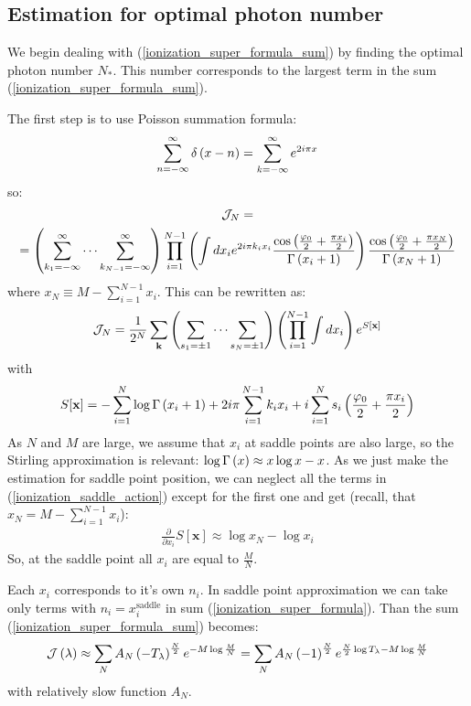 \subsection{Estimation for optimal photon number}
We begin dealing with (\ref{ionization_super_formula_sum}) by finding the optimal photon number $ N_* $. This number corresponds to the largest term in the sum (\ref{ionization_super_formula_sum}).

The first step is to use Poisson summation formula:
\begin{gather}
	\sum_{n=-\infty}^\infty
	\delta\left(x - n\right)
	=
	\sum_{k=-\infty}^\infty
	e^{2i\pi x}
\end{gather} 
so:
\begin{multline}
	\mathcal{J}_N
	=
	\\
	=
	\left(
	\sum_{k_1=-\infty}^\infty
	\cdots
	\sum_{k_{N-1}=-\infty}^\infty
	\right)
	\prod_{i=1}^{N-1}
	\left(
	\int d x_i
	e^{2i \pi k_i x_i}
	\frac
		{	
			\cos
			\left(
				\frac{\varphi_0}{2}
				+
			\frac{\pi x_i}{2}
			\right)
		}
		{\Gamma\left(x_i+1\right)}
	\right)
	\frac
{
	\cos
	\left(
		\frac{\varphi_0}{2}
		+
		\frac{\pi x_{N}}{2}
	\right)
}
{\Gamma\left(x_{N}+1\right)}
\end{multline}
where $ x_{N} \equiv M - \sum_{i=1}^{N-1} x_i$. This can be rewritten as:
\begin{gather}
		\mathcal{J}_N
		=
		\frac{1}{2^{N}}
		\sum_{\mathbf{k}}
		\left(
			\sum_{s_1=\pm 1}
			\cdots
			\sum_{s_{N}=\pm1}
		\right)
	\left(
		\prod_{i=1}^{N-1}
		\int
		d x_i
	\right)
	e^{S[\mathbf{x}]}
\end{gather}
with 
\begin{gather}
\label{ionization_saddle_action}
	S[\mathbf{x}]
	=
	-
	\sum_{i=1}^{N}
	\log \Gamma\left(x_i+1\right)
	+
	2i\pi\sum_{i=1}^{N-1}
	k_i x_i
	+
	i
	\sum_{i=1}^{N}
	s_i
	\left(\frac{\varphi_0}{2}
	+
	\frac{\pi x_i}{2}	
	\right)
\end{gather}
As $ N $ and $ M $ are large, we assume that $ x_i $ at saddle points are also large, so the Stirling approximation is relevant: $\log \Gamma\left(x\right) \approx x\log x - x $. As we just make the estimation for saddle point position, we can neglect all the terms in (\ref{ionization_saddle_action}) except for the first one and get (recall, that $ x_{N}
= M-\sum_{i=1}^{N-1}x_i $):
\begin{gather}
	\frac{\partial}{\partial x_i}
	S[\mathbf{x}]
	\approx
	\log{x_{N}}-\log{x_i}
\end{gather}
So, at the saddle point all $ x_i $ are equal to $ \frac{M}{N} $. 

Each $ x_i $ corresponds to  it's own $ n_i $. In saddle point approximation we can take only terms with $ n_i = x_i^{\mathrm{saddle}} $ in sum (\ref{ionization_super_formula}). Than the sum (\ref{ionization_super_formula_sum})  becomes:
\begin{gather}
\label{ionization_sum_saddle}
	\mathcal{J}\left(\lambda\right)
	\approx
	\sum_N
	A_N
	\left(-T_\lambda\right)^\frac{N}{2}
	e^{-
		M
		\log\frac{M}{N}
	}
=
\sum_N
A_N
\left(-1\right)^\frac{N}{2}
e^{\frac{N}{2}
\log T_\lambda
-
M\log\frac{M}{N}
 }
\end{gather}
with relatively slow function $ A_N $. 

